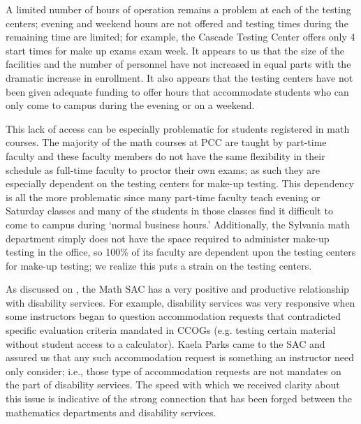 A limited number of hours of operation remains a problem at each of the testing
centers;   evening and weekend hours are not offered and testing times during
the remaining time are limited; for example, the Cascade Testing Center 
offers only 4 start times for make up exams exam week.  It appears to us that the size of  the
facilities and the number of personnel  have not increased in equal parts with
the dramatic increase in enrollment.   It also appears that the testing centers
have not been given adequate funding to offer hours that accommodate students
who can only come to campus during the evening or on a weekend.

This lack of access can be especially problematic for students registered in
math courses.  The majority of the math courses at PCC are taught by part-time
faculty and these faculty members do not have the same flexibility in their
schedule as full-time faculty to proctor their own exams; as such they are
especially dependent on the testing centers for make-up testing. This
dependency is all the more problematic since many part-time faculty teach
evening or Saturday classes and many of the students in those classes find it
difficult to come to campus during `normal business hours.' Additionally, the
Sylvania math department simply does not have the space required to
administer make-up testing in the office, so 100\% of its faculty are dependent
upon the testing centers for make-up testing;   we realize this puts a strain
on the testing centers. 



As discussed on ,
the Math SAC has a very positive and productive relationship with disability
services.  For example, disability services was very responsive when some
instructors began to question accommodation requests that contradicted specific
evaluation criteria mandated in CCOGs (e.g. testing certain material without
student access to a calculator).  Kaela Parks came to the SAC and assured us
that any such accommodation request is something an instructor need only
consider; i.e., those type of accommodation requests are not mandates on the
part of disability services.  The speed with which we received clarity about
this issue is indicative of the strong connection that has been forged between
the mathematics departments and disability services.


